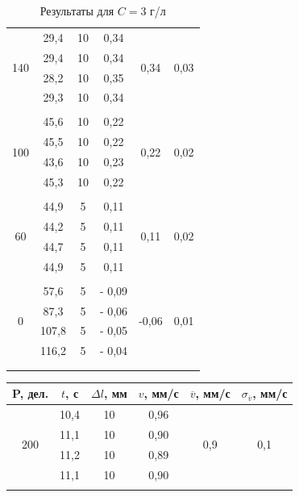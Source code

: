 \documentclass[a4paper, 12pt]{article}%
\begin{document}
\begin{enumerate}
\begin{longtable} {|c|c|c|c|c|c|}
		  \multirow{4}{*}{140}& 29,4 & 10 & 0,34 &  \multirow{4}{*}{0,34}    & \multirow{4}{*}{0,03}\\ \cline{2-4}
		 & 29,4 & 10 &    0,34         &               &\\ \cline{2-4}
		 & 28,2 & 10 &     0,35         &              & \\ \cline{2-4}
		 & 29,3 & 10 &    0,34           &             &\\ \hline
		 &&&&&\\ \hline
		 
		  \multirow{4}{*}{100}& 45,6 & 10 & 0,22 &  \multirow{4}{*}{0,22}    & \multirow{4}{*}{0,02}\\ \cline{2-4}
		 & 45,5 & 10 &    0,22         &               &\\ \cline{2-4}
		 & 43,6 & 10 &     0,23         &              & \\ \cline{2-4}
		 & 45,3 & 10 &    0,22           &             &\\ \hline
		 &&&&&\\ \hline
		 
		  \multirow{4}{*}{60}& 44,9 & 5 & 0,11 &  \multirow{4}{*}{0,11}    & \multirow{4}{*}{0,02}\\ \cline{2-4}
		 & 44,2 & 5 &    0,11         &               &\\ \cline{2-4}
		 & 44,7 & 5 &     0,11         &              & \\ \cline{2-4}
		 & 44,9 & 5 &    0,11           &             &\\ \hline
		 &&&&&\\ \hline
		 
		 \multirow{4}{*}{0}& 57,6 & 5 & - 0,09 &  \multirow{4}{*}{-0,06}    & \multirow{4}{*}{0,01}\\ \cline{2-4}
		 & 87,3 & 5 &    - 0,06         &               &\\ \cline{2-4}
		 &107,8 & 5 &     - 0,05         &              & \\ \cline{2-4}
		 & 116,2 & 5 &   - 0,04           &             &\\ \hline
		 &&&&&\\ \hline
		\caption{Результаты для $ C = 3 $ г/л  }
	\end{longtable}
	
	\newpage
	
	
	\begin{longtable} {|c|c|c|c|c|c|}
		\hline
		P, дел. & $ t $, с &   $ \Delta l$, мм  & $v$,  мм/с   & $\overline v $, мм/с & $\sigma_{\overline v}$, мм/с\\ \hline
		\multirow{4}{*}{200}& 10,4 & 10 & 0,96 &  \multirow{4}{*}{0,9}    & \multirow{4}{*}{0,1}\\ \cline{2-4}
		& 11,1 & 10 &    0,90         &               &\\ \cline{2-4}
		& 11,2 & 10 &     0,89         &              & \\ \cline{2-4}
		& 11,1 & 10 &    0,90           &             &\\ \hline
		&&&&&\\ \hline
		

\end{longtable}
\end{enumerate}
\end{document}
